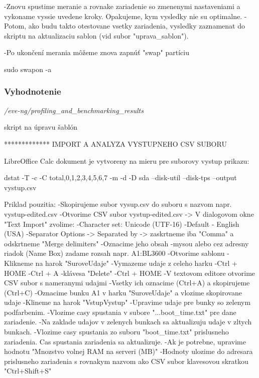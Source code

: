 -Znovu spustime meranie a rovnake zariadenie so zmenenymi nastaveniami a vykoname 
  vyssie uvedene kroky. Opakujeme, kym vysledky nie su optimalne.
-Potom, ako budu takto otestovane vsetky zariadenia, vysledky zaznamenat do
  skriptu na aktualizaciu sablon (vid subor "uprava\_sablon").



-Po ukončení merania môžeme znova zapnúť "swap" partíciu

  sudo swapon -a






\subsubsection{Vyhodnotenie}
\label{chap:testovanie_zariadeni_benchmark_vyhodnotenie}

\emph{/eve-ng/profiling\_and\_benchmarking\_results}

skript na úpravu šablón

*************
IMPORT A ANALYZA VYSTUPNEHO CSV SUBORU

LibreOffice Calc dokument je vytvoreny na mieru pre suborovy vystup prikazu:

  dstat -T -c -C total,0,1,2,3,4,5,6,7 -m -d -D sda --disk-util --disk-tps --output vystup.csv

Priklad pouzitia:
-Skopirujeme subor vysup.csv do suboru s nazvom napr. vystup-edited.csv
-Otvorime CSV subor vystup-edited.csv -> V dialogovom okne "Text Import" zvolime:
  -Character set: Unicode (UTF-16)
  -Default - English (USA)
  -Separator Options -> Separated by -> zaskrtneme iba "Comma" a 
    odskrtneme "Merge delimiters"
-Oznacime jeho obsah
  -mysou alebo cez adresny riadok (Name Box) zadame rozsah napr. A1:BL3600
-Otvorime sablonu
-Klikneme na harok "SuroveUdaje"
-Vymazeme udaje z celeho harku
  -Ctrl + HOME
  -Ctrl + A
  -klávesa "Delete"
  -Ctrl + HOME
-V textovom editore otvorime CSV subor s nameranymi udajmi
  -Vsetky ich oznacime (Ctrl+A) a skopirujeme (Ctrl+C)
-Oznacime bunku A1 v harku "SuroveUdaje" a vlozime skopirovane udaje
-Klineme na harok "VstupVystup"
-Upravime udaje pre bunky so zelenym podfarbenim.
  -Vlozime casy spustania v subore "...boot\_time.txt" pre dane zariadenie.
  -Na zaklade udajov v zelenych bunkach sa aktualizuju udaje v zltych bunkach.
-Vlozime casy spustania zo suboru "boot\_time.txt" prislusneho zariadenia.
 Cas spustania zariadenia sa aktualizuje.
-Ak je potrebne, upravime hodnotu "Mnozstvo volnej RAM na serveri (MB)"
-Hodnoty ulozime do adresara prislusneho zariadenia s rovnakym nazvom ako
 CSV subor klavesovou skratkou "Ctrl+Shift+S"


